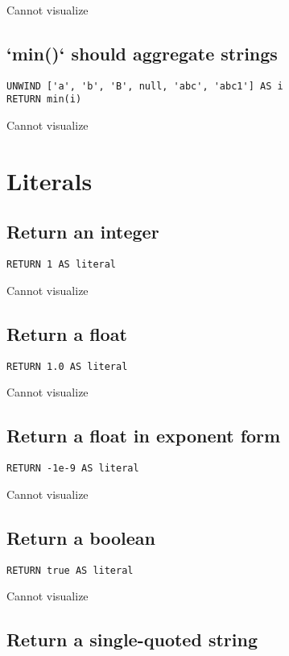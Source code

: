 Cannot visualize
\subsection{`min()` should aggregate strings}

\begin{lstlisting}
UNWIND ['a', 'b', 'B', null, 'abc', 'abc1'] AS i
RETURN min(i)
\end{lstlisting}

Cannot visualize
\section{Literals}

\subsection{Return an integer}

\begin{lstlisting}
RETURN 1 AS literal
\end{lstlisting}

Cannot visualize
\subsection{Return a float}

\begin{lstlisting}
RETURN 1.0 AS literal
\end{lstlisting}

Cannot visualize
\subsection{Return a float in exponent form}

\begin{lstlisting}
RETURN -1e-9 AS literal
\end{lstlisting}

Cannot visualize
\subsection{Return a boolean}

\begin{lstlisting}
RETURN true AS literal
\end{lstlisting}

Cannot visualize
\subsection{Return a single-quoted string}


